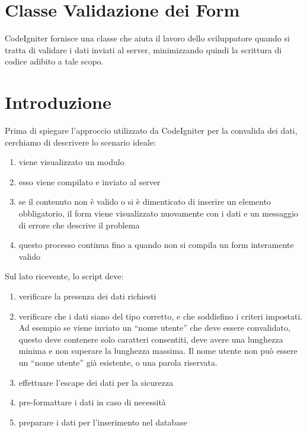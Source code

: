 \section{Classe Validazione dei Form}
\label{class:formvalidation}

CodeIgniter fornisce una classe che aiuta il lavoro dello sviluppatore quando si tratta di validare i dati inviati al server, minimizzando quindi la scrittura di codice adibito a tale scopo.

\section*{Introduzione}

Prima di spiegare l'approccio utilizzato da CodeIgniter per la convalida dei dati, cerchiamo di descrivere lo scenario ideale:

\begin{enumerate}
\item viene visualizzato un modulo
\item esso viene compilato e inviato al server
\item se il contenuto non è valido o si è dimenticato di inserire un elemento obbligatorio, il form viene visualizzato nuovamente con i dati e un messaggio di errore che descrive il problema
\item questo processo continua fino a quando non si compila un form interamente valido
\end{enumerate}

Sul lato ricevente, lo script deve:

\begin{enumerate}
\item verificare la presenza dei dati richiesti
\item verificare che i dati siano del tipo corretto, e che soddisfino i criteri impostati. Ad esempio se viene inviato un ``nome utente'' che deve essere convalidato, questo deve contenere solo caratteri consentiti, deve avere una lunghezza minima e non superare la lunghezza massima. Il nome utente non può essere un ``nome utente'' già esistente, o una parola riservata.
\item effettuare l'escape dei dati per la sicurezza
\item pre-formattare i dati in caso di necessità
\item preparare i dati per l'inserimento nel database
\end{enumerate}


